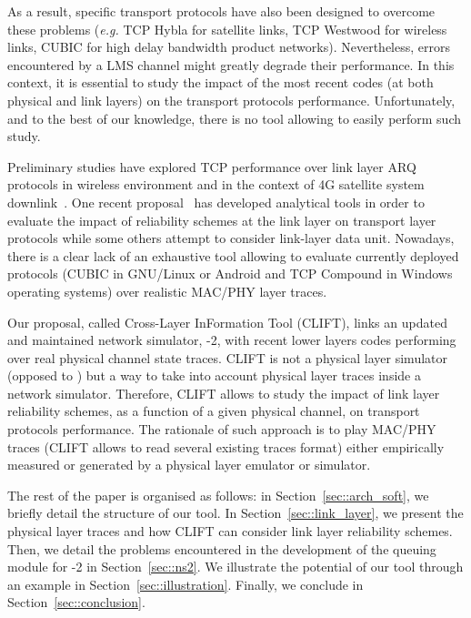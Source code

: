 \documentclass[conference,letterpaper]{IEEEtran}
\begin{document}
As a result, specific transport protocols have also been designed to overcome these problems (\textit{e.g.} TCP Hybla for satellite links, TCP Westwood for wireless links, CUBIC for high delay bandwidth product networks). Nevertheless, errors encountered by a LMS channel might greatly degrade their performance. In this context, it is essential to study the impact of the most recent codes (at both physical and link layers) on the transport protocols performance. Unfortunately, and to the best of our knowledge, there is no tool allowing to easily perform such study.  

Preliminary studies have explored TCP performance over link layer ARQ protocols in wireless environment \cite{tcp_arq_1,tcp_arq_2} and in the context of 4G satellite system downlink~\cite{tcp_4G}. One recent proposal~\cite{aimd} has developed analytical tools in order to evaluate the impact of reliability schemes at the link layer on transport layer protocols while some others \cite{ll_ns2,barakat_fec_arq} attempt to consider link-layer data unit.
Nowadays, there is a clear lack of an exhaustive tool allowing to evaluate currently deployed protocols (CUBIC in GNU/Linux or Android and TCP Compound in Windows operating systems) over realistic MAC/PHY layer traces.

Our proposal, called Cross-Layer InFormation Tool (CLIFT), links an updated and maintained network simulator, -2, with recent lower layers codes performing over real physical channel state traces. CLIFT is not a physical layer simulator (opposed to \cite{ns-3}) but a way to take into account physical layer traces inside a network simulator. Therefore, CLIFT allows to study the impact of link layer reliability schemes, as a function of a given physical channel, on transport protocols performance. The rationale of such approach is to play MAC/PHY traces (CLIFT allows to read several existing traces format) either empirically measured or generated by a physical layer emulator or simulator.




The rest of the paper is organised as follows: in Section~\ref{sec::arch_soft}, we briefly detail the structure of our tool. In Section~\ref{sec::link_layer}, we present the physical layer traces and how CLIFT can consider link layer reliability schemes. Then, we detail the problems encountered in the development of the queuing module for -2 in Section~\ref{sec::ns2}. We illustrate the potential of our tool through an example in Section~\ref{sec::illustration}. Finally, we conclude in Section~\ref{sec::conclusion}.
\end{document}
